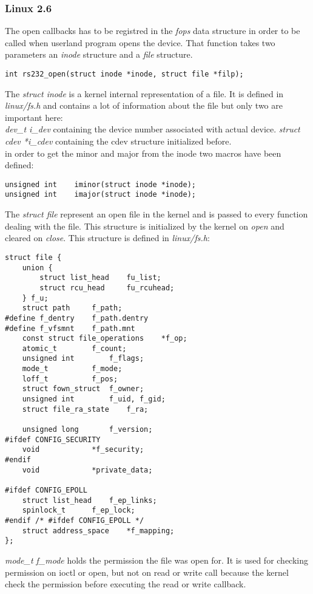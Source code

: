 \documentclass[11pt]{report}
\begin{document}
\subsubsection{Linux 2.6}
The open callbacks has to be registred in the {\it fops} data structure in order to be
called when userland program opens the device.
That function takes two parameters an  {\it inode} structure and a
{\it file} structure.
\begin{lstlisting}
int rs232_open(struct inode *inode, struct file *filp);
\end{lstlisting}
The  {\it struct inode} is a kernel internal representation of a file. It is
defined in  {\it linux/fs.h} and contains a lot of information about the file
but only two are important here:\\
{\it dev\_t i\_dev} containing the device number associated with actual device.
{\it struct cdev *i\_cdev} containing the cdev structure initialized before.\\
in order to get the minor and major from the inode two macros have been
defined:
\begin{lstlisting}
unsigned int    iminor(struct inode *inode);
unsigned int    imajor(struct inode *inode);
\end{lstlisting}
The {\it struct file} represent an open file in the kernel and is passed to
every function dealing with the file. This structure is initialized by the
kernel on {\it open} and cleared on {\it close}. This structure is defined in
{\it linux/fs.h}:
\begin{lstlisting}
struct file {
	union {
		struct list_head	fu_list;
		struct rcu_head 	fu_rcuhead;
	} f_u;
	struct path		f_path;
#define f_dentry	f_path.dentry
#define f_vfsmnt	f_path.mnt
	const struct file_operations	*f_op;
	atomic_t		f_count;
	unsigned int 		f_flags;
	mode_t			f_mode;
	loff_t			f_pos;
	struct fown_struct	f_owner;
	unsigned int		f_uid, f_gid;
	struct file_ra_state	f_ra;

	unsigned long		f_version;
#ifdef CONFIG_SECURITY
	void			*f_security;
#endif
	void			*private_data;

#ifdef CONFIG_EPOLL
	struct list_head	f_ep_links;
	spinlock_t		f_ep_lock;
#endif /* #ifdef CONFIG_EPOLL */
	struct address_space	*f_mapping;
};
\end{lstlisting}
{\it mode\_t f\_mode} holds the permission the file was open for. It is used
for checking permission on ioctl or open, but not on read or write call
because the kernel check the permission before executing the read or write
callback.\\
\end{document}
